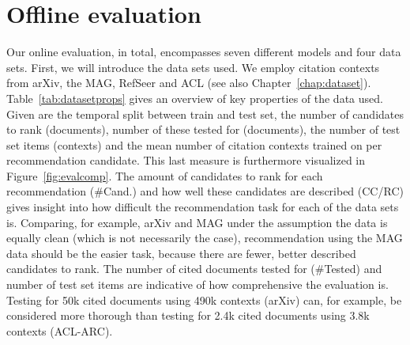 \section{Offline evaluation}\label{sec:offeval}
Our online evaluation, in total, encompasses seven different models and four data sets. First, we will introduce the data sets used. We  employ citation contexts from arXiv, the MAG, RefSeer and ACL (see also Chapter~\ref{chap:dataset}). Table~\ref{tab:datasetprops} gives an overview of key properties of the data used. Given are the temporal split between train and test set, the number of candidates to rank (documents), number of these tested for (documents), the number of test set items (contexts) and the mean number of citation contexts trained on per recommendation candidate. This last measure is furthermore visualized in Figure~\ref{fig:evalcomp}. The amount of candidates to rank for each recommendation (\#Cand.) and how well these candidates are described (CC/RC) gives insight into how difficult the recommendation task for each of the data sets is. Comparing, for example, arXiv and MAG under the assumption the data is equally clean (which is not necessarily the case), recommendation using the MAG data should be the easier task, because there are fewer, better described candidates to rank. The number of cited documents tested for (\#Tested) and number of test set items are indicative of how comprehensive the evaluation is. Testing for 50k cited documents using 490k contexts (arXiv) can, for example, be considered more thorough than testing for 2.4k cited documents using 3.8k contexts (ACL-ARC).


